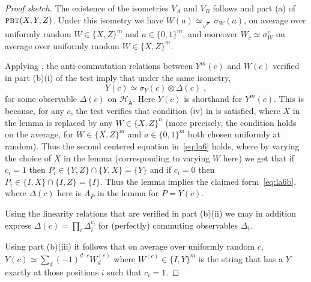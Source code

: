 \documentclass{toc}
\newcommand{\reg}[1]{{\textsf{#1}}}
\newcommand{\mH}{\mathcal{H}}
\newcommand{\eps}{\varepsilon}
\newcommand{\pbt}{\textsc{pbt}}
\begin{document}
\begin{proof}[Proof sketch]
The existence of the isometries $V_A$ and $V_B$ follows  and part (a) of $\pbt(X,Y,Z)$. 
 Under this isometry we have $W(a) \simeq_{\sqrt{\eps}} \sigma_W(a)$, on average over uniformly random $W\in\{X,Z\}^m$ and $a\in\{0,1\}^m$, and moreover $W_c \simeq \sigma_W^c$ on average over uniformly random $W\in\{X,Z\}^m$. 

Applying , the anti-commutation relations between $Y^m(c)$ and $W(c)$ verified in part (b)(i) of the test imply that under the same isometry,
\begin{equation}\label{eq:la6b}
 Y(c) \simeq \sigma_Y(c) \otimes {\Delta}(c)\;,
\end{equation}
for some observable ${\Delta}(c)$ on ${\mH}_{\hat{\reg{A}}}$. Here $Y(c)$ is shorthand for $Y^m(c)$. This is because, for any $c$, the test verifies that condition (iv) in  is satisfied, where $X$ in the lemma is replaced by any $W\in\{X,Z\}^n$ (more precisely, the condition holds on the average, for $W\in\{X,Z\}^m$ and $a\in\{0,1\}^m$ both chosen uniformly at random). Thus the second centered equation in~\eqref{eq:la6} holds, where by varying the choice of $X$ in the lemma (corresponding to varying $W$ here) we get that if $c_i=1$ then $P_i\in \{Y,Z\}\cap \{Y,X\}=\{Y\}$ and if $c_i=0$ then $P_i\in \{I,X\}\cap\{I,Z\}=\{I\}$. Thus the lemma implies the claimed form~\eqref{eq:la6b}, where $\Delta(c)$ here is $A_P$ in the lemma for $P=Y(c)$. 

Using the linearity relations that are verified in part (b)(ii) we may in addition express $\Delta(c) = \prod_i \Delta_{i}^{c_i}$ for (perfectly) commuting observables $\Delta_i$. 





Using part (b)(iii) it follows that on average over uniformly random $c$, $Y(c)\simeq \sum_d  (-1)^{d\cdot c} W^{(c)}_d$ where $W^{(c)} \in \{I,Y\}^m$ is the string that has a $Y$ exactly at those positions $i$ such that $c_i=1$. 



\end{proof}
\end{document}
